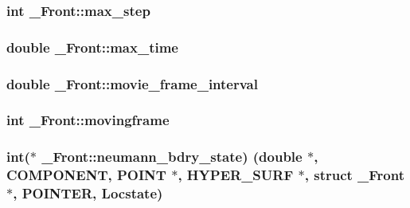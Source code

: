 \subsubsection[{\texorpdfstring{max\+\_\+step}{max_step}}]{\setlength{\rightskip}{0pt plus 5cm}int \+\_\+\+Front\+::max\+\_\+step}\hypertarget{struct___front_a8f84f3187d7a91538ab1e08a981874e8}{}\label{struct___front_a8f84f3187d7a91538ab1e08a981874e8}
\subsubsection[{\texorpdfstring{max\+\_\+time}{max_time}}]{\setlength{\rightskip}{0pt plus 5cm}double \+\_\+\+Front\+::max\+\_\+time}\hypertarget{struct___front_afcf356d93edf2cf48c167f49c3a846df}{}\label{struct___front_afcf356d93edf2cf48c167f49c3a846df}
\subsubsection[{\texorpdfstring{movie\+\_\+frame\+\_\+interval}{movie_frame_interval}}]{\setlength{\rightskip}{0pt plus 5cm}double \+\_\+\+Front\+::movie\+\_\+frame\+\_\+interval}\hypertarget{struct___front_a1d5740d53261b96036333de190be952f}{}\label{struct___front_a1d5740d53261b96036333de190be952f}
\subsubsection[{\texorpdfstring{movingframe}{movingframe}}]{\setlength{\rightskip}{0pt plus 5cm}int \+\_\+\+Front\+::movingframe}\hypertarget{struct___front_a029a4ab3c8031888ade9cfa6f1d3ceb5}{}\label{struct___front_a029a4ab3c8031888ade9cfa6f1d3ceb5}
\subsubsection[{\texorpdfstring{neumann\+\_\+bdry\+\_\+state}{neumann_bdry_state}}]{\setlength{\rightskip}{0pt plus 5cm}int($\ast$ \+\_\+\+Front\+::neumann\+\_\+bdry\+\_\+state) (double $\ast$, {\bf C\+O\+M\+P\+O\+N\+E\+NT}, {\bf P\+O\+I\+NT} $\ast$, {\bf H\+Y\+P\+E\+R\+\_\+\+S\+U\+RF} $\ast$, struct {\bf \+\_\+\+Front} $\ast$, {\bf P\+O\+I\+N\+T\+ER}, {\bf Locstate})}\hypertarget{struct___front_ab11f43eb41c1638b624abc8a314d34f6}{}\label{struct___front_ab11f43eb41c1638b624abc8a314d34f6}
